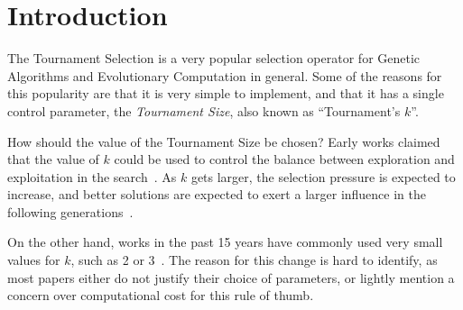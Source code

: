 \section{Introduction}\label{intro}


The Tournament Selection is a very popular selection operator for
Genetic Algorithms and Evolutionary Computation in general. Some of
the reasons for this popularity are that it is very simple to
implement, and that it has a single control parameter, the
\emph{Tournament Size}, also known as ``Tournament's $k$''.

How should the value of the Tournament Size be chosen? Early works
claimed that the value of $k$ could be used to control the balance
between exploration and exploitation in the
search~\cite{blickle1995mathematical}. As $k$ gets larger, the
selection pressure is expected to increase, and better solutions are
expected to exert a larger influence in the following
generations~\cite{miller1995genetic}.

On the other hand, works in the past 15 years have commonly used very
small values for $k$, such as 2 or
3~\cite{deb2000efficient,beyer2001self,
  kaelo2007integrated,nicolau2009application,
  sawyerr2011comparative,sawyerr2015benchmarking,
  oztekin2018decision}. The reason for this change is hard to
identify, as most papers either do not justify their choice of
parameters, or lightly mention a concern over computational cost for
this rule of thumb.


